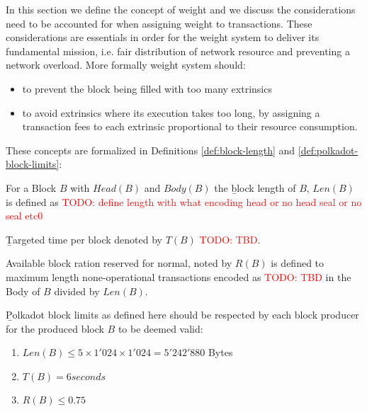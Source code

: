 \documentclass[11pt,a4paper]{article}
\newcommand{\todo}[1]{\textcolor{red}{TODO: #1}}
\begin{document}
In this section we define the concept of weight and we discuss the considerations need to be accounted for when assigning weight to transactions. These considerations are essentials in order for the weight system to deliver its fundamental mission, i.e. fair distribution of network resource and preventing a network overload. More formally weight system should:

\begin{itemize}
\item to prevent the block being filled with too many extrinsics
\item to avoid extrinsics where its execution takes too long, by assigning a transaction fees to each extrinsic proportional to their resource consumption.
\end{itemize}

These concepts are formalized in Definitions \ref{def:block-length} and \ref{def:polkadot-block-limits}:

\begin{definition}
  \label{def:block-length}
       For a Block $B$ with $Head(B)$ and $Body(B)$ the {\b block length of $B$}, $Len(B)$ is defined as \todo{define length with what encoding head or no head seal or no seal etc0}
\end{definition}

\begin{definition}
  \label{def:target-time-per-block}
  {\b Targeted time per block} denoted by $T(B)$ \todo{TBD}.
\end{definition}

\begin{definition}
  \label{def:block-target-time}
  Available block ration reserved for normal, noted by $R(B)$ is defined to maximum length none-operational transactions encoded as
  \todo{TBD} in the Body of $B$ divided by $Len(B)$.
\end{definition}

\begin{definition}
  \label{def:polkadot-block-limits}
        {\b Polkadot block limits} as defined here should be respected by each block producer for the produced block $B$ to be deemed valid:
        
        \begin{enumerate}
         \item $Len(B) \le 5 \times 1'024 \times 1'024 = 5'242'880$ Bytes
         \item $T(B) = 6 seconds$
         \item $R(B) \le 0.75$
        \end{enumerate}
        
\end{definition}
\end{document}
